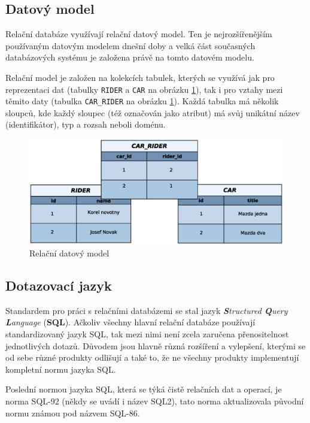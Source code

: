 \subsection{Datový model}
Relační databáze využívají relační datový model. Ten je nejrozšířenějším používaným datovým modelem dnešní doby a velká část současných databázových systému je založena právě na tomto datovém modelu.

Relační model je založen na kolekcích tabulek, kterých se využívá jak pro reprezentaci dat (tabulky \texttt{RIDER} a \texttt{CAR} na obrázku \ref{fig:rel_model}), tak i pro vztahy mezi těmito daty (tabulka \texttt{CAR\_RIDER} na obrázku \ref{fig:rel_model}). Každá tabulka má několik sloupců, kde každý sloupec (též označován jako atribut) má svůj unikátní název (identifikátor), typ a rozsah neboli doménu.
\begin{figure}[h]
  \begin{center}
    \includegraphics[width=40em]{obr/rel_model}
    \caption{Relační datový model}
    \label{fig:rel_model}
  \end{center}
\end{figure}
\subsection{Dotazovací jazyk}
Standardem pro práci s relačními databázemi se stal jazyk \emph{\textbf{S}tructured \textbf{Q}uery \textbf{L}anguage} (\textbf{SQL}). Ačkoliv všechny hlavní relační databáze používají standardizovaný jazyk SQL, tak mezi nimi není zcela zaručena přenositelnost jednotlivých dotazů. Důvodem jsou hlavně různá rozšíření a vylepšení, kterými se od sebe různé produkty odlišují a také to, že ne všechny produkty implementují kompletní normu jazyka SQL.

Poslední normou jazyka SQL, která se týká čistě relačních dat a operací, je norma SQL-92 (někdy se uvádí i název SQL2), tato norma aktualizovala původní normu známou pod názvem SQL-86.

